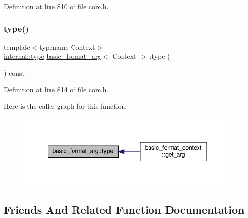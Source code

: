 Definition at line 810 of file core.\+h.

\mbox{\label{classbasic__format__arg_adf7349643b80568c84a5872b89b2f141}} 
\subsubsection{\texorpdfstring{type()}{type()}}
{\footnotesize\ttfamily template$<$typename Context$>$ \\
\hyperlink{namespaceinternal_a8661864098ac0acff9a6dd7e66f59038}{internal\+::type} \hyperlink{classbasic__format__arg}{basic\+\_\+format\+\_\+arg}$<$ Context $>$\+::type (\begin{DoxyParamCaption}{ }\end{DoxyParamCaption}) const\hspace{0.3cm}{\ttfamily [inline]}}



Definition at line 814 of file core.\+h.

Here is the caller graph for this function\+:
\nopagebreak
\begin{figure}[H]
\begin{center}
\leavevmode
\includegraphics[width=342pt]{classbasic__format__arg_adf7349643b80568c84a5872b89b2f141_icgraph}
\end{center}
\end{figure}


\subsection{Friends And Related Function Documentation}
\mbox{\label{classbasic__format__arg_ab8e9e33cc7b78829001a86ef6110ebb6}} 
